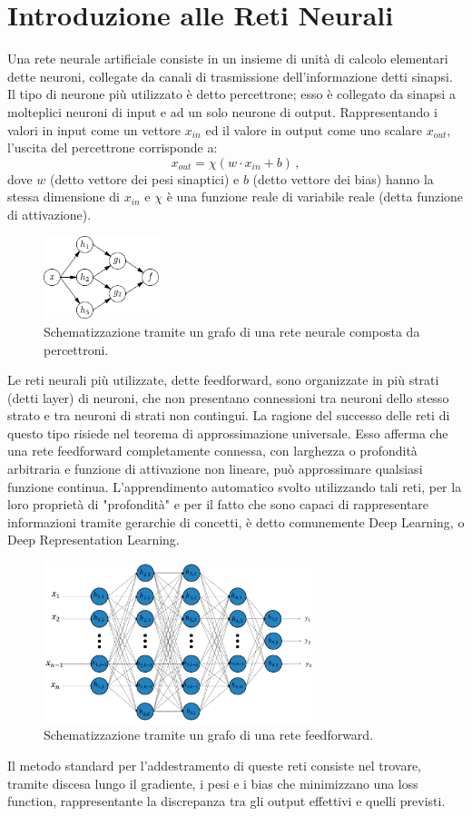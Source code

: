 \documentclass[Lau, noexaminfo, oneside]{sapthesis} %
\begin{document}
\section{Introduzione alle Reti Neurali}
Una rete neurale artificiale consiste in un insieme di unità di calcolo elementari dette neuroni, collegate da canali di trasmissione dell'informazione detti sinapsi.
Il tipo di neurone più utilizzato è detto percettrone; esso è collegato da sinapsi a molteplici neuroni di input e ad un solo neurone di output. Rappresentando i valori in input come un vettore $x_{in}$ ed il valore in output come uno scalare $x_{out}$, l'uscita del percettrone corrisponde a:
\begin{equation}
x_{out} = \chi (w \cdot x_{in} + b) \,,
\end{equation}
dove $w$ (detto vettore dei pesi sinaptici) e $b$ (detto vettore dei bias) hanno la stessa dimensione di $x_{in}$ e $\chi$ è una funzione reale di variabile reale (detta funzione di attivazione).
\begin{figure}[H]
\includegraphics[width=0.3\textwidth]{grafo.pdf}
\centering
\caption{Schematizzazione tramite un grafo di una rete neurale composta da percettroni.}
\end{figure}
Le reti neurali più utilizzate, dette feedforward, sono organizzate in più strati (detti layer) di neuroni, che non presentano connessioni tra neuroni dello stesso strato e tra neuroni di strati non contingui.
La ragione del successo delle reti di questo tipo risiede nel teorema di approssimazione universale. Esso afferma che una rete feedforward completamente connessa, con larghezza o profondità arbitraria e funzione di attivazione non lineare, può approssimare qualsiasi funzione continua. L'apprendimento automatico svolto utilizzando tali reti, per la loro proprietà di "profondità" e per il fatto che sono capaci di rappresentare informazioni tramite gerarchie di concetti, è detto comunemente Deep Learning, o Deep Representation Learning.
\begin{figure}[H]
\includegraphics[width=0.7\textwidth]{information-10-00122-g002.png}
\centering
\caption{Schematizzazione tramite un grafo di una rete feedforward.}
\end{figure}
Il metodo standard per l'addestramento di queste reti consiste nel trovare, tramite discesa lungo il gradiente, i pesi e i bias che minimizzano una loss function, rappresentante la discrepanza tra gli output effettivi e quelli previsti.
\end{document}
